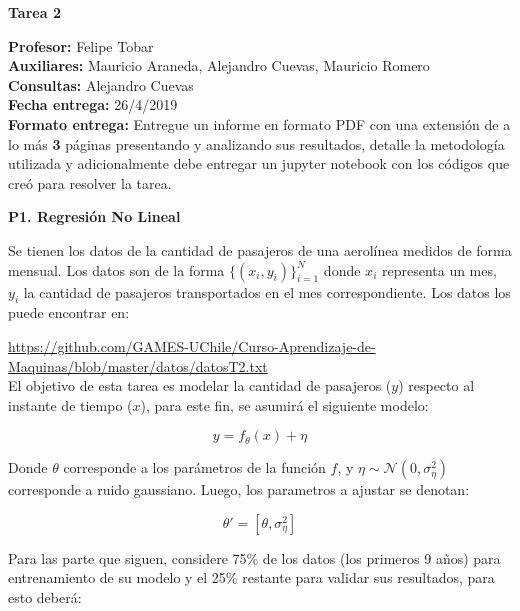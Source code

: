 \documentclass[11pt,letterpaper]{article}
\begin{document}
\pagestyle{fancy}
\fancyhf{}

\begin{center}
\large {\textbf{Tarea 2}}\\
\end{center}
\textbf{Profesor:} Felipe Tobar\\ 
\textbf{Auxiliares:} Mauricio Araneda, Alejandro Cuevas, Mauricio Romero \\
\textbf{Consultas:} Alejandro Cuevas \\
\textbf{Fecha entrega:} 26/4/2019 \\

\textbf{Formato entrega:} Entregue un informe en formato PDF con una extensión de a lo más \textbf{3} páginas presentando y analizando sus resultados, detalle la metodología utilizada y adicionalmente debe entregar un jupyter notebook con los códigos que creó para resolver la tarea.
\vspace{5mm}


\vspace{5 mm}
\noindent\textbf{P1. Regresión No Lineal}
\vspace{5 mm}

Se tienen los datos de la cantidad de pasajeros de una aerolínea medidos de forma mensual. Los datos son de la forma $\{(x_i,y_i)\}_{i=1}^N$ donde $x_i$ representa un mes, $y_i$ la cantidad de pasajeros transportados en el mes correspondiente. Los datos los puede encontrar en:

\url{https://github.com/GAMES-UChile/Curso-Aprendizaje-de-Maquinas/blob/master/datos/datosT2.txt}\\

El objetivo de esta tarea es modelar la cantidad de pasajeros ($y$) respecto al instante de tiempo ($x$), para este fin, se asumirá el siguiente modelo:

$$y = f_\theta(x)+\eta $$

Donde $\theta$ corresponde a los parámetros de la función $f$, y $\eta \sim \mathcal{N}(0,\sigma_{\eta}^2)$ corresponde a ruido gaussiano.
Luego, los parametros a ajustar se denotan:

$$ \theta' = [\theta, \sigma_{\eta}^2]$$

Para las parte que siguen, considere 75\% de los datos (los primeros 9 años) para entrenamiento de su modelo y el 25\% restante para validar sus resultados, para esto deberá:
\end{document}
